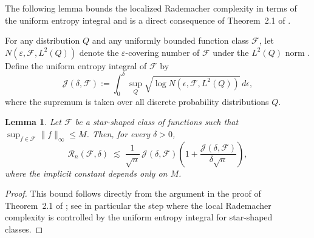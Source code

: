 \documentclass{article}
\theoremstyle{plain}
\newtheorem{lemma}{Lemma}
\theoremstyle{definition}
\theoremstyle{remark}
\begin{document}
The following lemma bounds the localized Rademacher complexity in terms of the
uniform entropy integral and is a direct consequence of Theorem~2.1 of
\citet{van2011local}.

For any distribution \(Q\) and any uniformly bounded function class
\(\mathcal{F}\), let \(N(\varepsilon, \mathcal{F}, L^2(Q))\) denote the
\(\varepsilon\)-covering number of \(\mathcal{F}\) under the \(L^2(Q)\) norm
\citep{van1996weak}.
Define the uniform entropy integral of \(\mathcal{F}\) by
\begin{equation*}
\mathcal{J}(\delta, \mathcal{F})
:=
\int_{0}^{\delta}
\sup_{Q}
\sqrt{\log N(\epsilon, \mathcal{F}, L^2(Q))}\, d\epsilon ,
\end{equation*}
where the supremum is taken over all discrete probability distributions \(Q\).

\begin{lemma}\label{lemma:local_rademacher_entropy}
Let \(\mathcal{F}\) be a star-shaped class of functions such that
\(\sup_{f\in\mathcal F}\|f\|_\infty \le M\). Then, for every \(\delta>0\),
\[
\mathcal{R}_n(\mathcal{F}, \delta)
\;\lesssim\;
\frac{1}{\sqrt n}\,\mathcal{J}(\delta,\mathcal{F})
\left(1+\frac{\mathcal{J}(\delta,\mathcal{F})}{\delta \sqrt n}\right),
\]
where the implicit constant depends only on \(M\).
\end{lemma}
\begin{proof}
This bound follows directly from the argument in the proof of
Theorem~2.1 of \citet{van2011local}; see in particular the step where
the local Rademacher complexity is controlled by the uniform entropy
integral for star-shaped classes.
\end{proof}
\end{document}
